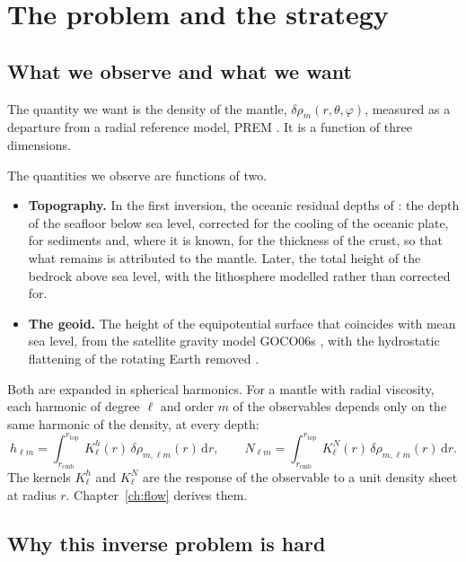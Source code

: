 \chapter{The problem and the strategy}
\label{ch:problem}

\section{What we observe and what we want}

The quantity we want is the density of the mantle, $\delta\rho_m(r,\theta,\varphi)$, measured as a departure from a radial reference model, PREM \citep{dziewonski1981preliminary}.
It is a function of three dimensions.

The quantities we observe are functions of two.
\begin{itemize}[nosep]
\item \textbf{Topography.} In the first inversion, the oceanic residual depths of \citet{holdt_densely_2022}: the depth of the seafloor below sea level, corrected for the cooling of the oceanic plate, for sediments and, where it is known, for the thickness of the crust, so that what remains is attributed to the mantle.
Later, the total height of the bedrock above sea level, with the lithosphere modelled rather than corrected for.
\item \textbf{The geoid.} The height of the equipotential surface that coincides with mean sea level, from the satellite gravity model GOCO06s \citep{kvas_goco06s_2021}, with the hydrostatic flattening of the rotating Earth removed \citep{chambat_flattening_2010}.
\end{itemize}

Both are expanded in spherical harmonics.
For a mantle with radial viscosity, each harmonic of degree $\ell$ and order $m$ of the observables depends only on the same harmonic of the density, at every depth:
\begin{equation}
    h_{\ell m} = \int_{r_{\mathrm{cmb}}}^{r_{\mathrm{top}}} K^{h}_{\ell}(r)\,\delta\rho_{m,\ell m}(r)\,\mathrm{d}r,
    \qquad
    N_{\ell m} = \int_{r_{\mathrm{cmb}}}^{r_{\mathrm{top}}} K^{N}_{\ell}(r)\,\delta\rho_{m,\ell m}(r)\,\mathrm{d}r .
    \label{eq:p-kernels}
\end{equation}
The kernels $K^{h}_\ell$ and $K^{N}_\ell$ are the response of the observable to a unit density sheet at radius $r$.
Chapter~\ref{ch:flow} derives them.

\section{Why this inverse problem is hard}

